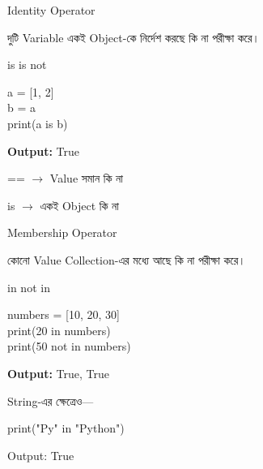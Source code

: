 \noindent
\begin{minipage}[t]{0.49\linewidth}

\begin{sideexamplebox}{Identity Operator}

দুটি Variable একই Object-কে নির্দেশ করছে কি না পরীক্ষা করে।

\begin{center}
\textenglish{\ttfamily is}
\qquad
\textenglish{\ttfamily is not}
\end{center}

\begin{sidecodebox}
\begin{english}
\ttfamily
a = [1, 2]\\
b = a\\
print(a is b)
\end{english}
\end{sidecodebox}

\textbf{Output:}
\textenglish{\ttfamily True}

\medskip

\textenglish{\ttfamily ==}
\(\longrightarrow\)
Value সমান কি না

\medskip

\textenglish{\ttfamily is}
\(\longrightarrow\)
একই Object কি না

\end{sideexamplebox}

\end{minipage}
\hfill
\begin{minipage}[t]{0.49\linewidth}

\begin{sideexamplebox}{Membership Operator}

কোনো Value Collection-এর মধ্যে আছে কি না পরীক্ষা করে।

\begin{center}
\textenglish{\ttfamily in}
\qquad
\textenglish{\ttfamily not in}
\end{center}

\begin{sidecodebox}
\begin{english}
\ttfamily
numbers = [10, 20, 30]\\
print(20 in numbers)\\
print(50 not in numbers)
\end{english}
\end{sidecodebox}

\textbf{Output:}
\textenglish{\ttfamily True, True}

\medskip

String-এর ক্ষেত্রেও—

\begin{sidecodebox}
\begin{english}
\ttfamily
print("Py" in "Python")
\end{english}
\end{sidecodebox}

Output:
\textenglish{\ttfamily True}

\end{sideexamplebox}

\end{minipage}

